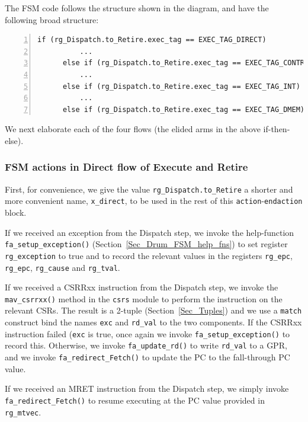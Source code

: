 The FSM code follows the structure shown in the diagram, and have the
following broad structure:

{\small
\begin{Verbatim}[frame=single, numbers=left, label=src\_Drum/CPU\_FSM.bsv: line 192 ...]
      if (rg_Dispatch.to_Retire.exec_tag == EXEC_TAG_DIRECT)
          ...
      else if (rg_Dispatch.to_Retire.exec_tag == EXEC_TAG_CONTROL)
          ...
      else if (rg_Dispatch.to_Retire.exec_tag == EXEC_TAG_INT)
          ...
      else if (rg_Dispatch.to_Retire.exec_tag == EXEC_TAG_DMEM)
\end{Verbatim}
}

We next elaborate each of the four flows (the elided arms in the above
if-then-else).


\subsubsection{FSM actions in Direct flow of Execute and Retire}



First, for convenience, we give the value \verb|rg_Dispatch.to_Retire|
a shorter and more convenient name, \verb|x_direct|, to be used in the
rest of this \verb|action|-\verb|endaction| block.

If we received an exception from the Dispatch step, we invoke the
help-function \verb|fa_setup_exception()|
(Section~\ref{Sec_Drum_FSM_help_fns}) to set register
\verb|rg_exception| to true and to record the relevant values in the
registers \verb|rg_epc|, \verb|rg_epc|, \verb|rg_cause| and
\verb|rg_tval|.

If we received a CSRRxx instruction from the Dispatch step, we invoke
the \verb|mav_csrrxx()| method in the \verb|csrs| module to perform
the instruction on the relevant CSRs.  The result is a 2-tuple
(Section~\ref{Sec_Tuples}) and we use a \verb|match| construct bind
the names \verb|exc| and \verb|rd_val| to the two components.  If the
CSRRxx instruction failed (\verb|exc| is true, once again we invoke
\verb|fa_setup_exception()| to record this.  Otherwise, we invoke
\verb|fa_update_rd()| to write \verb|rd_val| to a GPR, and we invoke
\verb|fa_redirect_Fetch()| to update the PC to the fall-through PC
value.

If we received an MRET instruction from the Dispatch step, we simply
invoke \verb|fa_redirect_Fetch()| to resume executing at the PC value
provided in \verb|rg_mtvec|.

